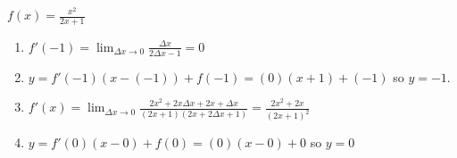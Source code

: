 \documentclass{ximera}
\begin{document}
\begin{question}
\begin{problem} \label{rationaltangentlast} 
$f(x) = \frac{x^2}{2x+1}$ 

\begin{solution}
\begin{enumerate}  

\item  $f'(-1) = \lim_{\Delta x \rightarrow 0} \frac{\Delta x}{2 \Delta x - 1} = 0$

\item $y = f'(-1)(x-(-1)) + f(-1) = (0) (x+1) + (-1)$ so $y = -1$.

\item  $f'(x) =\lim_{\Delta x \rightarrow 0}\frac{2x^2+2x\Delta x+2x+\Delta x}{(2x+1)(2x+2\Delta x+1)}=  \frac{2x^2+2x}{(2x+1)^2}$

\item  $y = f'(0)(x-0) + f(0) = (0)(x-0)+0$ so $y = 0$

\end{enumerate}
\end{solution}
\end{problem}

\end{question}
\end{document}
